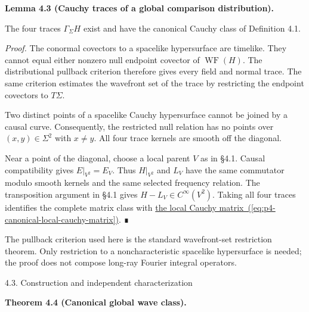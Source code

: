 \documentclass[
  english,
  11pt,
  reqno]{amsart}
\makeatletter
\newcommand{\pandocstatementheading}[1]{%
  \par\addpenalty{\@beginparpenalty}%
  \addvspace{.5\baselineskip plus .2\baselineskip minus .2\baselineskip}%
  {\normalfont\bfseries #1\par}%
  \nobreak\@afterindenttrue\@afterheading
}
\newcommand{\paperstatementsection}{\@startsection{subsection}{2}%
  \z@{.5\linespacing\@plus.7\linespacing}{.35\baselineskip}%
  {\normalfont\bfseries}}
\newcommand{\paperfirststatement}[1]{%
  {\normalfont\bfseries #1\par}%
  \nobreak\@afterindenttrue\@afterheading}
\makeatother
\begin{document}
\pandocstatementheading{\protect{}\label{lem:p4-witness-cauchy-traces}Lemma 4.3 (Cauchy traces of a global comparison distribution).}

The four traces \(\Gamma_\Sigma H\) exist and have the canonical Cauchy
class of Definition 4.1.

\emph{Proof.} The conormal covectors to a spacelike hypersurface are
timelike. They cannot equal either nonzero null endpoint covector of
\(\operatorname{WF}(H)\). The distributional pullback criterion
therefore gives every field and normal trace. The same criterion
estimates the wavefront set of the trace by restricting the endpoint
covectors to \(T\Sigma\).

Two distinct points of a spacelike Cauchy hypersurface cannot be joined
by a causal curve. Consequently, the restricted null relation has no
points over \((x,y)\in\Sigma^2\) with \(x\ne y\). All four trace kernels
are smooth off the diagonal.

Near a point of the diagonal, choose a local parent \(V\) as in §4.1.
Causal compatibility gives \(E|_{V^2}=E_V\). Thus \(H|_{V^2}\) and
\(L_V\) have the same commutator modulo smooth kernels and the same
selected frequency relation. The transposition argument in §4.1 gives
\(H-L_V\in C^\infty(V^2)\). Taking all four traces identifies the
complete matrix class with
\hyperref[eq:p4-canonical-local-cauchy-matrix]{the local Cauchy matrix~(\ref*{eq:p4-canonical-local-cauchy-matrix})}.
∎

The pullback criterion used here is the standard wavefront-set
restriction theorem. Only restriction to a noncharacteristic spacelike
hypersurface is needed; the proof does not compose long-ray Fourier
integral operators.

\protect{}\label{sec:p4-canonical-global-kernel}
\paperstatementsection{4.3. Construction and independent
characterization}\label{construction-and-independent-characterization}
\paperfirststatement{\protect{}\label{thm:p4-global-canonical-wave-class}Theorem 4.4 (Canonical global wave class).}
\end{document}
